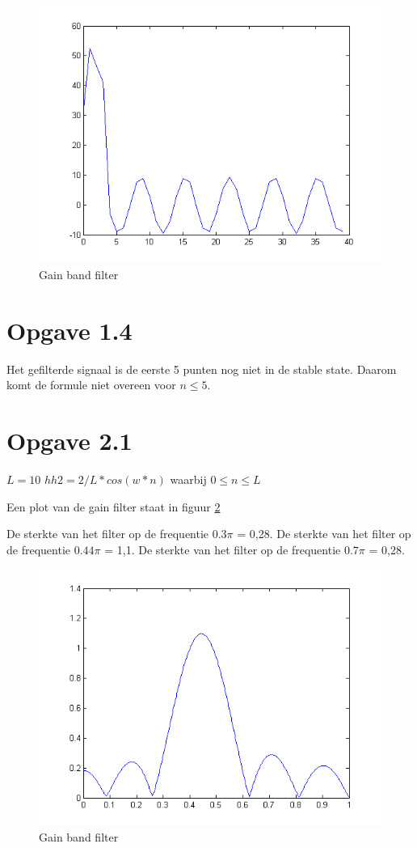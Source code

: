 \documentclass{article}
\begin{document}
\begin{figure}[h]
	\includegraphics{content/1_3.png}
	\caption{Gain band filter}
	\label{fig:opgave1_3}
\end{figure}

\section{Opgave 1.4}
Het gefilterde signaal is de eerste 5 punten nog niet in de stable state. Daarom komt de formule niet overeen voor $n \leq 5$.

\section{Opgave 2.1}
$L = 10$
$hh2 = 2/L * cos(w*n)$ waarbij $0\leq n \leq L$

Een plot van de gain filter staat in figuur \ref{fig:opgave2_1}

De sterkte van het filter op de frequentie $0.3\pi$  = 0,28.
De sterkte van het filter op de frequentie $0.44\pi$  = 1,1.
De sterkte van het filter op de frequentie $0.7\pi$  = 0,28.

\begin{figure}[h]
	\includegraphics{content/2_1.png}
	\caption{Gain band filter}
	\label{fig:opgave2_1}
\end{figure}
\end{document}
